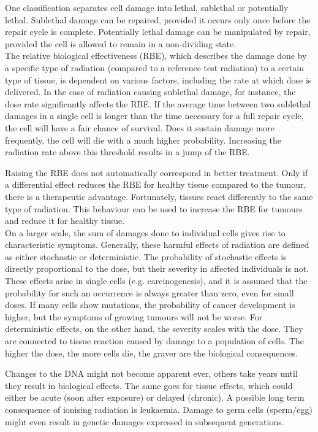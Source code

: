 One classification separates cell damage into lethal, sublethal or potentially lethal.
Sublethal damage can be repaired, provided it occurs only once before the repair cycle is complete.
Potentially lethal damage can be manipulated by repair, provided the cell is allowed to remain in a non-dividing state.\\

The relative biological effectiveness (RBE), which describes the damage done by a specific type of radiation (compared to a reference test radiation) to a certain type of tissue, is dependent on various factors, including the rate at which dose is delivered.
In the case of radiation causing sublethal damage, for instance, the dose rate significantly affects the RBE.
If the average time between two sublethal damages in a single cell is longer than the time necessary for a full repair cycle, the cell will have a fair chance of survival.
Does it sustain damage more frequently, the cell will die with a much higher probability.
Increasing the radiation rate above this threshold results in a jump of the RBE.

Raising the RBE does not automatically correspond in better treatment.
Only if a differential effect reduces the RBE for healthy tissue compared to the tumour, there is a therapeutic advantage.
Fortunately, tissues react differently to the same type of radiation.
This behaviour can be used to increase the RBE for tumours and reduce it for healthy tissue.\\

On a larger scale, the sum of damages done to individual cells gives rise to characteristic symptoms.
Generally, these harmful effects of radiation are defined as either stochastic or deterministic.
The probability of stochastic effects is directly proportional to the dose, but their severity in affected individuals is not.
These effects arise in single cells (e.g. carcinogenesis), and it is assumed that the probability for such an occurrence is always greater than zero, even for small doses.
If many cells show mutations, the probability of cancer development is higher, but the symptoms of growing tumours will not be worse.
For deterministic effects, on the other hand, the severity scales with the dose.
They are connected to tissue reaction caused by damage to a population of cells.
The higher the dose, the more cells die, the graver are the biological consequences.

Changes to the DNA might not become apparent ever, others take years until they result in biological effects.
The same goes for tissue effects, which could either be acute (soon after exposure) or delayed (chronic).
A possible long term consequence of ionising radiation is leukaemia.
Damage to germ cells (sperm/egg) might even result in genetic damages expressed in subsequent generations.


